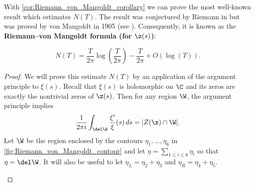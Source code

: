       With \cref{cor:Riemann_von_Mangoldt_corollary} we can prove the most well-known result which estimates $N(T)$. The result was conjectured by Riemann in \cite{riemann1859ueber} but was proved by von Mangoldt in 1905 (see \cite{mangoldt1905verteilung}). Consequently, it is known as the \textbf{Riemann–von Mangoldt formula (for $\z(s)$)}:

      \begin{theorem}
        \phantom{ }
        \[
          N(T) = \frac{T}{2\pi}\log\left(\frac{T}{2\pi}\right)-\frac{T}{2\pi}+O(\log(T)).
        \]
      \end{theorem}
      \begin{proof}
        We will prove this estimate $N(T)$ by an application of the argument principle to $\xi(s)$. Recall that $\xi(s)$ is holomorphic on $\C$ and its zeros are exactly the nontrivial zeros of $\z(s)$. Then for any region $\W$, the argument principle implies
        \[
          \frac{1}{2\pi i}\int_{\del\W}\frac{\xi'}{\xi}(s)\,ds = |Z(\z) \cap \W|.
        \]
        Let $\W$ be the region enclosed by the contours $\eta_{1},\ldots,\eta_{6}$ in \cref{fig:Riemann_von_Mangoldt_contour} and let $\eta = \sum_{1 \le i \le 6}\eta_{i}$ so that $\eta = \del\W$. It will also be useful to let $\eta_{L} = \eta_{2}+\eta_{3}$ and $\eta_{R} = \eta_{4}+\eta_{5}$.
        
        \begin{figure}[ht]
          \centering
\end{figure}
\end{proof}
